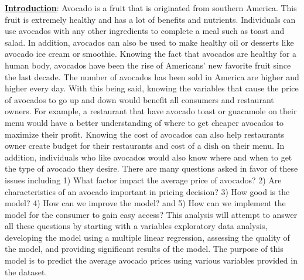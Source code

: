\documentclass[11pt]{article}\usepackage[]{graphicx}\usepackage[]{color}
\begin{document}
\noindent\textbf{\underline{Introduction}}: Avocado is a fruit that is originated from southern America. This fruit is extremely healthy and has a lot of benefits and nutrients. Individuals can use avocados with any other ingredients to complete a meal such as toast and salad. In addition, avocados can also be used to make healthy oil or desserts like avocado ice cream or smoothie. Knowing the fact that avocados are healthy for a human body, avocados have been the rise of Americans’ new favorite fruit since the last decade. The number of avocados has been sold in America are higher and higher every day. With this being said, knowing the variables that cause the price of avocados to go up and down would benefit all consumers and restaurant owners. For example, a restaurant that have avocado toast or guacamole on their menu would have a better understanding of where to get cheaper avocados to maximize their profit. Knowing the cost of avocados can also help restaurants owner create budget for their restaurants and cost of a dish on their menu. In addition, individuals who like avocados would also know where and when to get the type of avocado they desire. There are many questions asked in favor of these issues including 1) What factor impact the average price of avocados? 2) Are characteristics of an avocado important in pricing decision? 3) How good is the model? 4) How can we improve the model? and 5) How can we implement the model for the consumer to gain easy access? This analysis will attempt to answer all these questions by starting with a variables exploratory data analysis, developing the model using a multiple linear regression, assessing the quality of the model, and providing significant results of the model. The purpose of this model is to predict the average avocado prices using various variables provided in the dataset.         
\hfill \break
\end{document}
